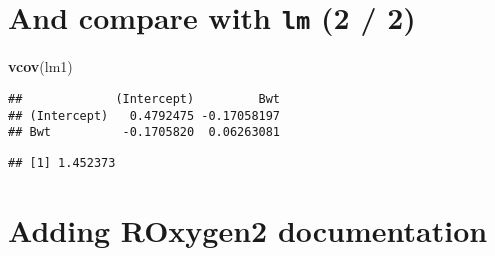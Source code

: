 \documentclass[]{book}
\newenvironment{Shaded}{\begin{snugshade}}{\end{snugshade}}
\newcommand{\KeywordTok}[1]{\textcolor[rgb]{0.13,0.29,0.53}{\textbf{{#1}}}}
\newcommand{\NormalTok}[1]{{#1}}
\theoremstyle{definition}
\theoremstyle{definition}
\theoremstyle{definition}
\theoremstyle{remark}
\begin{document}
\section{\texorpdfstring{And compare with \texttt{lm} (2 /
2)}{And compare with lm (2 / 2)}}\label{and-compare-with-lm-2-2}

\begin{Shaded}
\begin{Highlighting}[]
\KeywordTok{vcov}\NormalTok{(lm1)}
\end{Highlighting}
\end{Shaded}

\begin{verbatim}
##             (Intercept)         Bwt
## (Intercept)   0.4792475 -0.17058197
## Bwt          -0.1705820  0.06263081
\end{verbatim}

\begin{Shaded}
\end{Shaded}

\begin{verbatim}
## [1] 1.452373
\end{verbatim}

\section{Adding ROxygen2
documentation}\label{adding-roxygen2-documentation}
\end{document}
